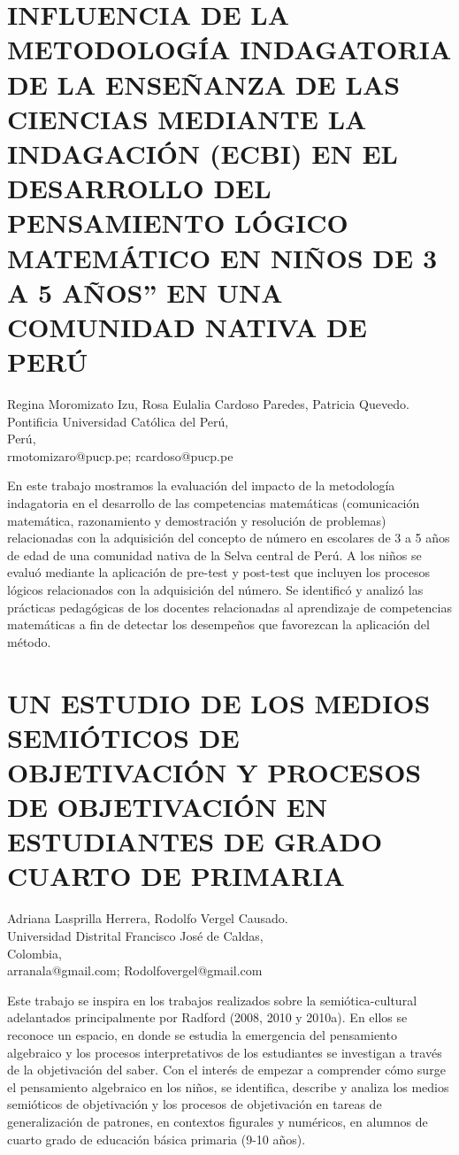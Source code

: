 \section{INFLUENCIA DE LA METODOLOGÍA INDAGATORIA DE LA ENSEÑANZA DE LAS CIENCIAS
MEDIANTE LA INDAGACIÓN (ECBI) EN EL DESARROLLO DEL PENSAMIENTO LÓGICO
MATEMÁTICO EN NIÑOS DE 3 A 5 AÑOS” EN UNA COMUNIDAD NATIVA DE PERÚ}

\begin{datos}
Regina Moromizato Izu, Rosa Eulalia Cardoso Paredes, Patricia Quevedo. \\
Pontificia Universidad Católica del Perú, \\
\hfill Perú, \\
\hfill rmotomizaro@pucp.pe; rcardoso@pucp.pe 
\end{datos}

En este trabajo mostramos la evaluación del impacto de la metodología
indagatoria en el desarrollo de las competencias matemáticas (comunicación
matemática, razonamiento y demostración y resolución de problemas)
relacionadas con la adquisición del concepto de número en escolares
de 3 a 5 años de edad de una comunidad nativa de la Selva central
de Perú. A los niños se evaluó mediante la aplicación de pre-test
y post-test que incluyen los procesos lógicos relacionados con la
adquisición del número. Se identificó y analizó las prácticas pedagógicas
de los docentes relacionadas al aprendizaje de competencias matemáticas
a fin de detectar los desempeños que favorezcan la aplicación del
método. 


\section{UN ESTUDIO DE LOS MEDIOS SEMIÓTICOS DE OBJETIVACIÓN Y PROCESOS DE
OBJETIVACIÓN EN ESTUDIANTES DE GRADO CUARTO DE PRIMARIA}

\begin{datos}
Adriana Lasprilla Herrera, Rodolfo Vergel Causado. \\
Universidad Distrital Francisco José de Caldas, \\
\hfill Colombia, \\
 \hfill  arranala@gmail.com; Rodolfovergel@gmail.com
\end{datos}

Este trabajo se inspira en los trabajos realizados sobre la semiótica-cultural
adelantados principalmente por Radford (2008, 2010 y 2010a). En ellos
se reconoce un espacio, en donde se estudia la emergencia del pensamiento
algebraico y los procesos interpretativos de los estudiantes se investigan
a través de la objetivación del saber. Con el interés de empezar a
comprender cómo surge el pensamiento algebraico en los niños, se identifica,
describe y analiza los medios semióticos de objetivación y los procesos
de objetivación en tareas de generalización de patrones, en contextos
figurales y numéricos, en alumnos de cuarto grado de educación básica
primaria (9-10 años).


